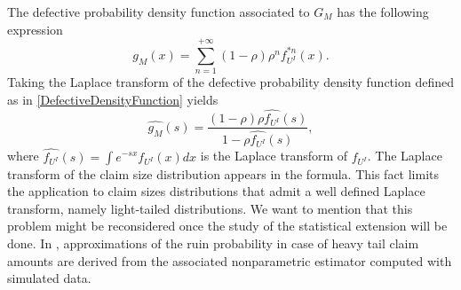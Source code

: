 The defective probability density function associated to $G_{M}$ has the following expression
\begin{equation}\label{DefectiveDensityFunction}
g_{M}(x)=\sum^{+\infty}_{n=1}(1-\rho)\rho^{n}f^{*n}_{U^{I}}(x).
\end{equation}
Taking the Laplace transform of the defective probability density function defined as in \eqref{DefectiveDensityFunction} yields
\begin{equation}\label{LaplaceTransform}
\widehat{g_{M}}(s)=\frac{(1-\rho)\rho\widehat{f_{U^{I}}}(s)}{1-\rho\widehat{f_{U^{I}}}(s)},
\end{equation}
where $\widehat{f_{U^{I}}}(s)=\int e^{-sx}f_{U^{I}}(x)dx$ is the Laplace transform of $f_{U^{I}}$. The Laplace transform of the claim size distribution appears in the formula. This fact limits the application to claim sizes distributions that admit a well defined Laplace transform, namely light-tailed distributions. We want to mention that this problem might be reconsidered once the study of the statistical extension will be done. In \citet{MnSaHa14}, approximations of the ruin probability in case of heavy tail claim amounts are derived from the associated nonparametric estimator computed with simulated data.
